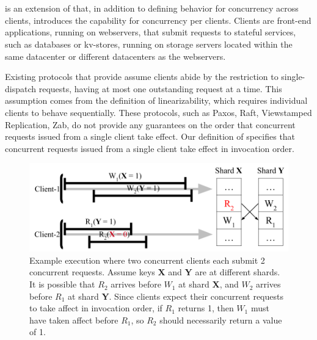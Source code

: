 \section{\mdl}
\mdl is an extension of \sdl that, in addition to defining behavior for concurrency across clients, introduces the capability for concurrency per clients. Clients are front-end applications, running on webservers, that submit requests to stateful services, such as databases or kv-stores, running on storage servers located within the same datacenter or different datacenters as the webservers.

Existing protocols that provide \sdl assume clients abide by the restriction to single-dispatch requests, having at most one outstanding request at a time. This assumption comes from the definition of linearizability, which requires individual clients to behave sequentially. These protocols, such as Paxos, Raft, Viewstamped Replication, Zab, do not provide any guarantees on the order that concurrent requests issued from a single client take effect. Our definition of \md specifies that concurrent requests issued from a single client take effect in invocation order. 

\begin{figure}[!htb]
\includegraphics[scale=.45]{somet.png}
\caption{Example execution where two concurrent clients each submit 2 concurrent requests. Assume keys \textbf{X} and \textbf{Y} are at different shards. It is possible that $R_2$ arrives before $W_1$ at shard \textbf{X}, and $W_2$ arrives before $R_1$ at shard \textbf{Y}. Since clients expect their concurrent requests to take affect in invocation order, if $R_1$ returns 1, then $W_1$ must have taken affect before $R_1$, so $R_2$ should necessarily return a value of 1.}
\label{fig:concurrentbatches}
\end{figure}

